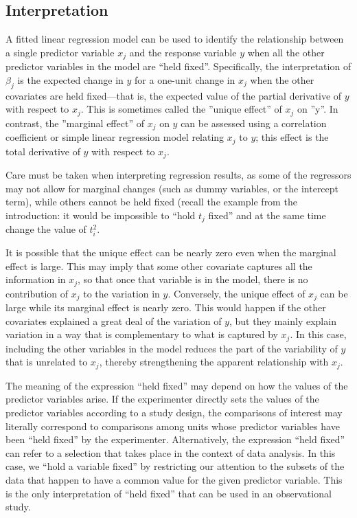 \subsection{Interpretation}

A fitted linear regression model can be used to identify the relationship between a single predictor variable $x_j$ and the response variable $y$ when all the other predictor variables in the model are “held fixed”. Specifically, the interpretation of $\beta_j$ is the expected change in $y$ for a one-unit change in $x_j$ when the other covariates are held fixed—that is, the expected value of the partial derivative of $y$ with respect to $x_j$. This is sometimes called the ''unique effect'' of $x_j$ on ''y''. In contrast, the ''marginal effect'' of $x_j$ on $y$ can be assessed using a correlation coefficient or simple linear regression model relating $x_j$ to $y$; this effect is the total derivative of $y$ with respect to $x_j$.

Care must be taken when interpreting regression results, as some of the regressors may not allow for marginal changes (such as dummy variables, or the intercept term), while others cannot be held fixed (recall the example from the introduction: it would be impossible to “hold $t_j$ fixed” and at the same time change the value of $t_i^2$.

It is possible that the unique effect can be nearly zero even when the marginal effect is large. This may imply that some other covariate captures all the information in $x_j$, so that once that variable is in the model, there is no contribution of $x_j$ to the variation in $y$. Conversely, the unique effect of $x_j$ can be large while its marginal effect is nearly zero. This would happen if the other covariates explained a great deal of the variation of $y$, but they mainly explain variation in a way that is complementary to what is captured by $x_j$. In this case, including the other variables in the model reduces the part of the variability of $y$ that is unrelated to $x_j$, thereby strengthening the apparent relationship with $x_j$.

The meaning of the expression “held fixed” may depend on how the values of the predictor variables arise. If the experimenter directly sets the values of the predictor variables according to a study design, the comparisons of interest may literally correspond to comparisons among units whose predictor variables have been “held fixed” by the experimenter. Alternatively, the expression “held fixed” can refer to a selection that takes place in the context of data analysis. In this case, we “hold a variable fixed” by restricting our attention to the subsets of the data that happen to have a common value for the given predictor variable. This is the only interpretation of “held fixed” that can be used in an observational study.

